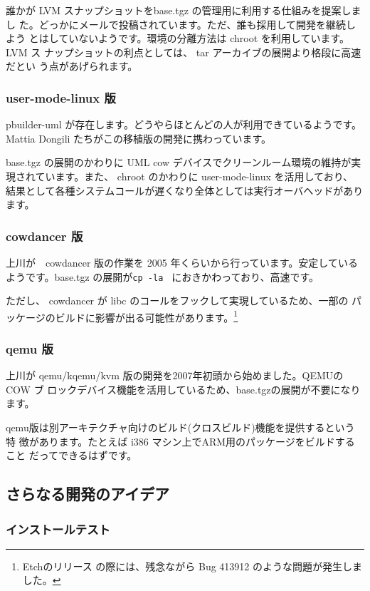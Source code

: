 \documentclass[mingoth,a4paper]{jsarticle}
\begin{document}
誰かが LVM スナップショットをbase.tgz の管理用に利用する仕組みを提案しまし
た。どっかにメールで投稿されています。ただ、誰も採用して開発を継続しよう
とはしていないようです。環境の分離方法は chroot を利用しています。LVM ス
ナップショットの利点としては、 tar アーカイブの展開より格段に高速だとい
う点があげられます。

\subsubsection{user-mode-linux 版}

pbuilder-uml が存在します。どうやらほとんどの人が利用できているようです。
Mattia Dongili たちがこの移植版の開発に携わっています。

base.tgz の展開のかわりに UML cow デバイスでクリーンルーム環境の維持が実
現されています。また、 chroot のかわりに user-mode-linux を活用しており、
結果として各種システムコールが遅くなり全体としては実行オーバヘッドがあり
ます。

\subsubsection{cowdancer 版}

上川が　cowdancer 版の作業を 2005 年くらいから行っています。安定している
ようです。base.tgz の展開が\texttt{cp -la } におきかわっており、高速です。

ただし、 cowdancer が libc のコールをフックして実現しているため、一部の
パッケージのビルドに影響が出る可能性があります。\footnote{Etchのリリース
の際には、残念ながら Bug 413912 のような問題が発生しました。}

\subsubsection{qemu 版}

上川が qemu/kqemu/kvm 版の開発を2007年初頭から始めました。QEMUの COW ブ
ロックデバイス機能を活用しているため、base.tgzの展開が不要になります。

qemu版は別アーキテクチャ向けのビルド(クロスビルド)機能を提供するという特
徴があります。たとえば i386 マシン上でARM用のパッケージをビルドすること
だってできるはずです。

\subsection{さらなる開発のアイデア}

\subsubsection{インストールテスト}
\end{document}
